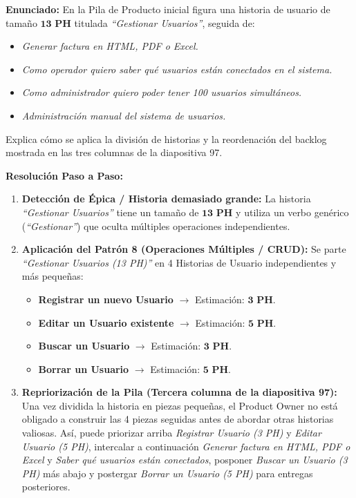 \begin{ejercicio}
\textbf{Enunciado:} En la Pila de Producto inicial figura una historia de usuario de tamaño $\mathbf{13\text{ PH}}$ titulada \textit{``Gestionar Usuarios''}, seguida de:
\begin{itemize}[itemsep=1pt]
    \item \textit{Generar factura en HTML, PDF o Excel.}
    \item \textit{Como operador quiero saber qué usuarios están conectados en el sistema.}
    \item \textit{Como administrador quiero poder tener 100 usuarios simultáneos.}
    \item \textit{Administración manual del sistema de usuarios.}
\end{itemize}
Explica cómo se aplica la división de historias y la reordenación del backlog mostrada en las tres columnas de la diapositiva 97.

\vspace{4pt}
\textbf{Resolución Paso a Paso:}
\begin{enumerate}[label=\textbf{\arabic*.}, itemsep=3pt]
    \item \textbf{Detección de Épica / Historia demasiado grande:} La historia \textit{``Gestionar Usuarios''} tiene un tamaño de $\mathbf{13\text{ PH}}$ y utiliza un verbo genérico (\textit{``Gestionar''}) que oculta múltiples operaciones independientes.
    \item \textbf{Aplicación del Patrón 8 (Operaciones Múltiples / CRUD):} Se parte \textit{``Gestionar Usuarios (13 PH)''} en 4 Historias de Usuario independientes y más pequeñas:
    \begin{itemize}
        \item \textbf{Registrar un nuevo Usuario} $\longrightarrow$ Estimación: $\mathbf{3\text{ PH}}$.
        \item \textbf{Editar un Usuario existente} $\longrightarrow$ Estimación: $\mathbf{5\text{ PH}}$.
        \item \textbf{Buscar un Usuario} $\longrightarrow$ Estimación: $\mathbf{3\text{ PH}}$.
        \item \textbf{Borrar un Usuario} $\longrightarrow$ Estimación: $\mathbf{5\text{ PH}}$.
    \end{itemize}
    \item \textbf{Repriorización de la Pila (Tercera columna de la diapositiva 97):} Una vez dividida la historia en piezas pequeñas, el Product Owner no está obligado a construir las 4 piezas seguidas antes de abordar otras historias valiosas. Así, puede priorizar arriba \textit{Registrar Usuario (3 PH)} y \textit{Editar Usuario (5 PH)}, intercalar a continuación \textit{Generar factura en HTML, PDF o Excel} y \textit{Saber qué usuarios están conectados}, posponer \textit{Buscar un Usuario (3 PH)} más abajo y postergar \textit{Borrar un Usuario (5 PH)} para entregas posteriores.
\end{enumerate}
\end{ejercicio}

